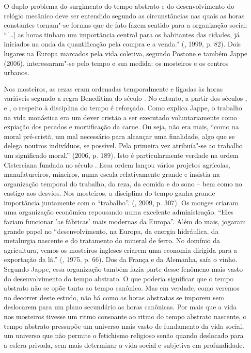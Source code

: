 O duplo problema do surgimento do tempo abstrato e do desenvolvimento do
relógio mecânico deve ser entendido segundo as circunstâncias nas quais
as horas constantes tornam"-se formas que de fato fazem sentido para a
organização social: ``[\ldots{}] as horas tinham um importância
central para os habitantes das cidades, já iniciados na onda da
quantificação pela compra e a venda.'' (, 1999, p. 82). Dois
lugares na Europa marcados pela vida coletiva, segundo Postone e também
Jappe (2006), interessaram"-se pelo tempo e sua medida: os mosteiros e os
centros urbanos.

Nos mosteiros, as rezas eram ordenadas temporalmente e ligadas às horas
variáveis segundo a regra Beneditina do século . No entanto, a partir
dos séculos ,  e , o respeito à disciplina do tempo é
reforçado. Como explica Jappe, o trabalho na vida monástica era um dever
cristão a ser executado voluntariamente como expiação dos pecados e
mortificação da carne. Ou seja, não era mais, ``como na moral
pré-cristã, um mal necessário para alcançar uma finalidade, algo que se
delega noutros indivíduos, se possível. Pela primeira vez atribuía"-se ao
trabalho um significado moral.'' (2006, p. 189). Isto é particularmente
verdade na ordem Cisterciana fundada no século . Essa ordem lançou
vários projetos agrícolas, manufatureiros, mineiros, numa escala
relativamente grande e insistia na organização temporal do trabalho, da
reza, da comida e do sono -- bem como no castigo aos desvios. Nos
mosteiros, a disciplina do tempo ganha grande importância juntamente com
o ``trabalho''. (, 2009, p. 307). Os monges criaram uma
organização econômica repousando numa excelente administração. ``Eles
faziam funcionar 'as fábricas' mais modernas da Europa''. Além do mais,
jogaram grande papel no ``desenvolvimento, na Europa, da energia
hidráulica, da metalurgia nascente e do tratamento do mineral de ferro.
No domínio da agricultura, vemos os mosteiros ingleses criarem uma
economia dirigida para a exportação da lã.'' (, 1975, p. 66). Dos
da França e da Alemanha, saía o vinho. Segundo Jappe, essa organização
também fazia parte desse fenômeno mais vasto do desenvolvimento do tempo
abstrato. O que poderia significar que o tempo abstrato não se opõe
tanto ao tempo canônico. Mas em verdade, como veremos no decorrer deste
estudo, não há como as horas abstratas se imporem sem deslocarem para um
plano secundário as horas canônicas. Por mais que a vida nos mosteiros
tivesse um ritmo consoante ao ritmo do tempo abstrato nascente, o tempo
abstrato pressupõe um universo mais vasto de fundamento da vida social,
um universo que não permite o fetichismo religioso senão quando
deslocado para a esfera privada, sem mais determinar a vida social e
subjetiva em profundidade.


